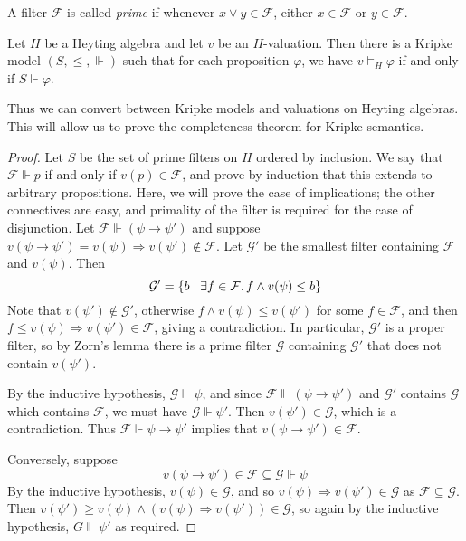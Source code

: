 A filter \( \mathcal F \) is called \emph{prime} if whenever \( x \vee y \in \mathcal F \), either \( x \in \mathcal F \) or \( y \in \mathcal F \).
\begin{lemma}
    Let \( H \) be a Heyting algebra and let \( v \) be an \( H \)-valuation.
    Then there is a Kripke model \( (S, \leq, \Vdash) \) such that for each proposition \( \varphi \), we have \( v \vDash_H \varphi \) if and only if \( S \Vdash \varphi \).
\end{lemma}
Thus we can convert between Kripke models and valuations on Heyting algebras.
This will allow us to prove the completeness theorem for Kripke semantics.
\begin{proof}
    Let \( S \) be the set of prime filters on \( H \) ordered by inclusion.
    We say that \( \mathcal F \Vdash p \) if and only if \( v(p) \in \mathcal F \), and prove by induction that this extends to arbitrary propositions.
    Here, we will prove the case of implications; the other connectives are easy, and primality of the filter is required for the case of disjunction.
    Let \( \mathcal F \Vdash (\psi \to \psi') \) and suppose \( v(\psi \to \psi') = v(\psi) \Rightarrow v(\psi') \notin \mathcal F \).
    Let \( \mathcal G' \) be the smallest filter containing \( \mathcal F \) and \( v(\psi) \).
    Then
    \[ \mathcal G' = \qty{b \mid \exists f \in \mathcal F.\, f \wedge v(\psi) \leq b} \]
    Note that \( v(\psi') \notin \mathcal G' \), otherwise \( f \wedge v(\psi) \leq v(\psi') \) for some \( f \in \mathcal F \), and then \( f \leq v(\psi) \Rightarrow v(\psi') \in \mathcal F \), giving a contradiction.
    In particular, \( \mathcal G' \) is a proper filter, so by Zorn's lemma there is a prime filter \( \mathcal G \) containing \( \mathcal G' \) that does not contain \( v(\psi') \).

    By the inductive hypothesis, \( \mathcal G \Vdash \psi \), and since \( \mathcal F \Vdash (\psi \to \psi') \) and \( \mathcal G' \) contains \( \mathcal G \) which contains \( \mathcal F \), we must have \( \mathcal G \Vdash \psi' \).
    Then \( v(\psi') \in \mathcal G \), which is a contradiction.
    Thus \( \mathcal F \Vdash \psi \to \psi' \) implies that \( v(\psi \to \psi') \in \mathcal F \).

    Conversely, suppose
    \[ v(\psi \to \psi') \in \mathcal F \subseteq \mathcal G \Vdash \psi \]
    By the inductive hypothesis, \( v(\psi) \in \mathcal G \), and so \( v(\psi) \Rightarrow v(\psi') \in \mathcal G \) as \( \mathcal F \subseteq \mathcal G \).
    Then \( v(\psi') \geq v(\psi) \wedge (v(\psi) \Rightarrow v(\psi')) \in \mathcal G \), so again by the inductive hypothesis, \( G \Vdash \psi' \) as required.


\end{proof}
